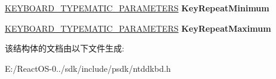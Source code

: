 \begin{DoxyCompactItemize}
\hyperlink{struct___k_e_y_b_o_a_r_d___t_y_p_e_m_a_t_i_c___p_a_r_a_m_e_t_e_r_s}{K\+E\+Y\+B\+O\+A\+R\+D\+\_\+\+T\+Y\+P\+E\+M\+A\+T\+I\+C\+\_\+\+P\+A\+R\+A\+M\+E\+T\+E\+RS} {\bfseries Key\+Repeat\+Minimum}
\item 
\mbox{\label{struct___k_e_y_b_o_a_r_d___a_t_t_r_i_b_u_t_e_s_a371c06ae9912082d72ee7a58bbe44430}} 
\hyperlink{struct___k_e_y_b_o_a_r_d___t_y_p_e_m_a_t_i_c___p_a_r_a_m_e_t_e_r_s}{K\+E\+Y\+B\+O\+A\+R\+D\+\_\+\+T\+Y\+P\+E\+M\+A\+T\+I\+C\+\_\+\+P\+A\+R\+A\+M\+E\+T\+E\+RS} {\bfseries Key\+Repeat\+Maximum}
\end{DoxyCompactItemize}


该结构体的文档由以下文件生成\+:\begin{DoxyCompactItemize}
\item 
E\+:/\+React\+O\+S-\/0../sdk/include/psdk/ntddkbd.\+h\end{DoxyCompactItemize}
